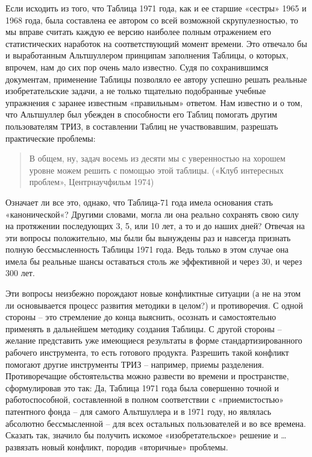 \documentclass[11pt,a4paper]{article}
\begin{document}
Если исходить из того, что Таблица 1971 года, как и ее старшие «сестры» 1965 и
1968 года, была составлена ее автором со всей возможной скрупулезностью, то мы
вправе считать каждую ее версию наиболее полным отражением его статистических
наработок на соответствующий момент времени. Это отвечало бы и выработанным
Альтшуллером принципам заполнения Таблицы, о которых, впрочем, нам до сих пор
очень мало известно. Судя по сохранившимся документам, применение Таблицы
позволяло ее автору успешно решать реальные изобретательские задачи, а не
только тщательно подобранные учебные упражнения с заранее известным
«правильным» ответом. Нам известно и о том, что Альтшуллер был убежден в
способности его Таблиц помогать другим пользователям ТРИЗ, в составлении
Таблиц не участвовавшим, разрешать практические проблемы:
\begin{quote}
  В общем, ну, задач восемь из десяти мы с уверенностью на хорошем уровне
  можем решить с помощью этой таблицы. («Клуб интересных проблем»,
  Центрнаучфильм 1974)
\end{quote}
Означает ли все это, однако, что Таблица-71 года имела основания стать
«канонической«? Другими словами, могла ли она реально сохранять свою силу на
протяжении последующих 3, 5, или 10 лет, а то и до наших дней? Отвечая на эти
вопросы положительно, мы были бы вынуждены раз и навсегда признать полную
бессмысленность Таблицы 1971 года. Ведь только в этом случае она имела бы
реальные шансы оставаться столь же эффективной и через 30, и через 300 лет.

Эти вопросы неизбежно порождают новые конфликтные ситуации (а не на этом ли
основывается процесс развития методики в целом?) и противоречия. С одной
стороны -- это стремление до конца выяснить, осознать и самостоятельно
применять в дальнейшем методику создания Таблицы. С другой стороны -- желание
представить уже имеющиеся результаты в форме стандартизированного рабочего
инструмента, то есть готового продукта. Разрешить такой конфликт помогают
другие инструменты ТРИЗ -- например, приемы разделения. Противоречащие
обстоятельства можно развести во времени и пространстве, сформулировав это
так: Да, Таблица 1971 года была совершенно точной и работоспособной,
составленной в полном соответствии с «приемистостью» патентного фонда -- для
самого Альтшуллера и в 1971 году, но являлась абсолютно бессмысленной -- для
всех остальных пользователей и во все времена. Сказать так, значило бы
получить искомое «изобретательское» решение и … развязать новый конфликт,
породив «вторичные» проблемы.
\end{document}
